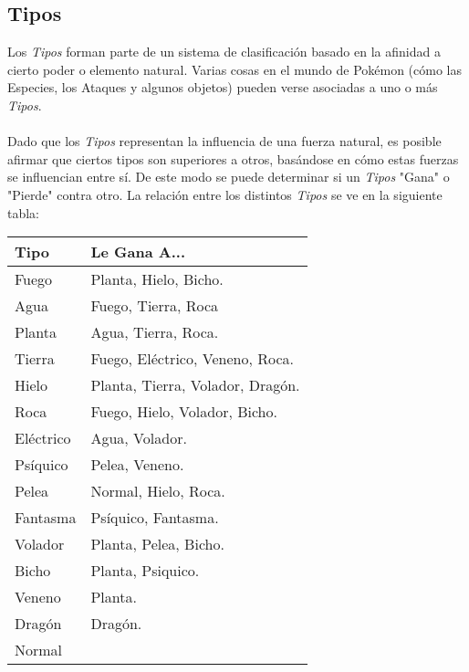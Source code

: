 \documentclass[spanish,a4paper]{article}
\begin{document}

\subsection{Tipos}

Los \textit{ Tipos } forman parte de un sistema de clasificación basado en la afinidad a cierto poder o elemento natural. 
Varias cosas en el mundo de Pokémon (cómo las Especies, los Ataques y algunos objetos) pueden verse asociadas a uno o más \textit{ Tipos}.
\\\\
Dado que los \textit{ Tipos } representan la influencia de una fuerza natural, es posible afirmar que ciertos tipos son superiores a otros, basándose en cómo estas fuerzas se influencian entre sí. De este modo se puede determinar si un \textit{ Tipos } "Gana" o "Pierde" contra otro. 
La relación entre los distintos \textit{ Tipos } se ve en la siguiente tabla:

\begin{center}
    \begin{tabular}{ | l | l |}
    \hline
    Tipo & Le Gana A... \\ \hline
    Fuego & Planta, Hielo, Bicho.\\ \hline
    Agua & Fuego, Tierra, Roca \\ \hline
    Planta & Agua, Tierra, Roca.\\ \hline
    Tierra & Fuego, Eléctrico, Veneno, Roca.\\ \hline
    Hielo & Planta, Tierra, Volador, Dragón.\\ \hline
    Roca & Fuego, Hielo, Volador, Bicho.\\ \hline
    Eléctrico & Agua, Volador.\\ \hline
    Psíquico & Pelea, Veneno.\\ \hline
    Pelea & Normal, Hielo, Roca.\\ \hline
    Fantasma & Psíquico, Fantasma.\\ \hline
    Volador & Planta, Pelea, Bicho.\\ \hline
    Bicho & Planta, Psiquico.\\ \hline
    Veneno & Planta.\\ \hline
    Dragón & Dragón.\\ \hline
    Normal & \\ \hline
    \end{tabular}
\end{center}
\end{document}
